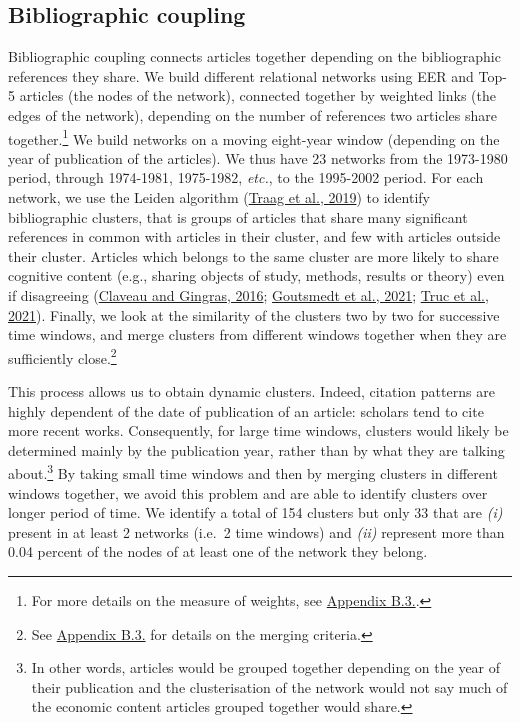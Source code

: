 \documentclass[
  12pt,
  onecolumn]{article}
\begin{document}
\hypertarget{bibliographic-coupling}{%
\subsection{Bibliographic coupling}\label{bibliographic-coupling}}

Bibliographic coupling connects articles together depending on the
bibliographic references they share. We build different relational
networks using EER and Top-5 articles (the nodes of the network),
connected together by weighted links (the edges of the network),
depending on the number of references two articles share
together.\footnote{For more details on the measure of weights, see
  \protect\hyperlink{network}{Appendix B.3.}.} We build networks on a
moving eight-year window (depending on the year of publication of the
articles). We thus have 23 networks from the 1973-1980 period, through
1974-1981, 1975-1982, \emph{etc.}, to the 1995-2002 period. For each
network, we use the Leiden algorithm
(\protect\hyperlink{ref-traag2019}{Traag et al., 2019}) to identify
bibliographic clusters, that is groups of articles that share many
significant references in common with articles in their cluster, and few
with articles outside their cluster. Articles which belongs to the same
cluster are more likely to share cognitive content (e.g., sharing
objects of study, methods, results or theory) even if disagreeing
(\protect\hyperlink{ref-claveau2016}{Claveau and Gingras, 2016};
\protect\hyperlink{ref-goutsmedt2021}{Goutsmedt et al., 2021};
\protect\hyperlink{ref-truc2021}{Truc et al., 2021}). Finally, we look
at the similarity of the clusters two by two for successive time
windows, and merge clusters from different windows together when they
are sufficiently close.\footnote{See
  \protect\hyperlink{network}{Appendix B.3.} for details on the merging
  criteria.}

This process allows us to obtain dynamic clusters. Indeed, citation
patterns are highly dependent of the date of publication of an article:
scholars tend to cite more recent works. Consequently, for large time
windows, clusters would likely be determined mainly by the publication
year, rather than by what they are talking about.\footnote{In other
  words, articles would be grouped together depending on the year of
  their publication and the clusterisation of the network would not say
  much of the economic content articles grouped together would share.}
By taking small time windows and then by merging clusters in different
windows together, we avoid this problem and are able to identify
clusters over longer period of time. We identify a total of 154 clusters
but only 33 that are \emph{(i)} present in at least 2 networks (i.e.~2
time windows) and \emph{(ii)} represent more than 0.04 percent of the
nodes of at least one of the network they belong.
\end{document}
